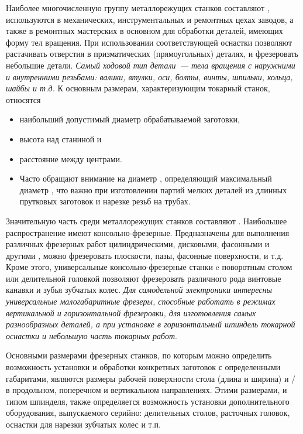 \label{stanki}
\secdown

\bigskip

Наиболее многочисленную группу металлорежущих станков составляют
, используются в механических, инструментальных
и ремонтных цехах заводов, а также в ремонтных мастерских в основном для
обработки деталей, имеющих форму тел вращения. При использовании соответствующей
оснастки позволяют растачивать отверстия в призматических (прямоугольных)
деталях, и фрезеровать небольшие детали. \emph{Самый ходовой тип детали\ ---
тела вращения с наружними и внутренними резьбами: валики, втулки, оси, болты,
винты, шпильки, кольца, шайбы и т.д.} К основным размерам, характеризующим
токарный станок, относятся
\begin{itemize}
  \item наибольший допустимый диаметр обрабатываемой заготовки,
  \item высота  над станиной и
  \item расстояние между центрами.
  \item
Часто обращают внимание на диаметр ,
определяющий максимальный диаметр , что важно при
изготовлении партий мелких деталей из длинных прутковых заготовок и нарезке
резьб на трубах.
\end{itemize}

\bigskip

Значительную часть среди металлорежущих станков составляют . Наибольшее распространение имеют консольно-фрезерные.
Предназначены для выполнения различных фрезерных работ цилиндрическими,
дисковыми, фасонными и другими , можно фрезеровать плоскости,
пазы, фасонные поверхности, и т.д. Кроме этого, универсальные
консольно-фрезерные станки c поворотным столом или делительной головкой
позволяют фрезеровать различного рода винтовые канавки и зубья зубчатых колес.
\emph{Для самодельной электроники интересны универсальные малогабаритные
фрезеры, способные работать в режимах вертикальной и горизонтальной фрезеровки,
для изготовления самых разнообразных деталей, а при установке в
горизонтальный шпиндель токарной оснастки и небольшую часть токарных работ}.

Основными размерами фрезерных станков, по которым можно определить возможность
установки и обработки конкретных заготовок с определенными габаритами, являются
размеры рабочей поверхности стола (длина и ширина) и / в продольном, поперечном и вертикальном направлениях.
Этими размерами, и типом шпинделя, также определяется возможность установки
дополнительного оборудования, выпускаемого серийно: делительных столов,
расточных головок, оснастки для нарезки зубчатых колес и т.п.

